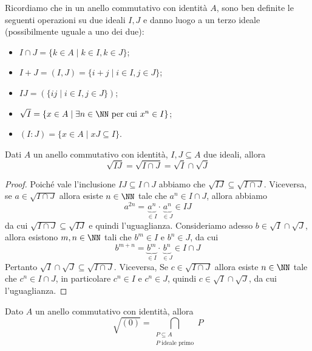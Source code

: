 \documentclass[11pt]{scrartcl}
\begin{document}
Ricordiamo che in un anello commutativo con identità $A$, sono ben definite
le seguenti operazioni su due ideali $I, J$ e danno luogo a un terzo ideale
(possibilmente uguale a uno dei due):
\begin{itemize}
    \item $I\cap J = \{k \in A \mid k \in I, k \in J\}$;
    \item $I + J = (I, J) = \{i + j \mid i \in I, j \in J\}$;
    \item $IJ = (\{ij\mid i \in I, j \in J\})$;
    \item $\sqrt{I} = \{x \in A \mid \exists n \in \NN \text{ per cui } x^n \in I\}$;
    \item $(I : J) = \{x \in A \mid xJ \subseteq I\}$.
\end{itemize}

\begin{proposition}
    Dati $A$ un anello commutativo con identità, $I, J \subseteq A$ due ideali,
    allora
    \[
        \sqrt{IJ} = \sqrt{I\cap J} = \sqrt{I}\cap \sqrt{J}
    \]
\end{proposition}

\begin{proof}
    Poiché vale l'inclusione $IJ \subseteq I\cap J$ abbiamo che $\sqrt{IJ}
    \subseteq \sqrt{I\cap J}$. Viceversa, se $a \in \sqrt{I\cap J}$ allora
    esiste $n \in \NN$ tale che $a^n \in I\cap J$, allora abbiamo 
    \[
        a^{2n} = \underset{\in I}{\underbrace{a^n}} \cdot \underset{\in J}{\underbrace{a^n}}
        \in IJ
    \]
    da cui $\sqrt{I\cap J} \subseteq \sqrt{IJ}$ e quindi l'uguaglianza.\newline
    Consideriamo adesso $b \in \sqrt{I}\cap \sqrt{J}$, allora esistono $m, n \in \NN$
    tali che $b^m \in I$ e $b^n \in J$, da cui
    \[
        b^{m + n} = \underset{\in I}{\underbrace{b^m}}\cdot
        \underset{\in J}{\underbrace{b^n}} \in I\cap J
    \]
    Pertanto $\sqrt{I}\cap \sqrt{J} \subseteq \sqrt{I\cap J}$. Viceversa, Se
    $c \in \sqrt{I\cap J}$ allora esiste $n \in \NN$ tale che $c^n \in I\cap J$, 
    in particolare $c^n \in I$ e $c^n \in J$, quindi $c \in \sqrt{I}\cap\sqrt{J}$,
    da cui l'uguaglianza.
\end{proof}

\begin{proposition}
    \label{prop2.9}
    Dato $A$ un anello commutativo con identità, allora
    \[
        \sqrt{(0)} = \bigcap_{\substack{P\subseteq A\\ P \text{ ideale primo}}}P
    \]
\end{proposition}
\end{document}
